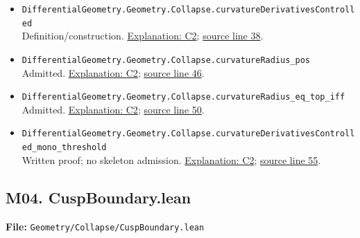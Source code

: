 \documentclass[
  letterpaper,
  11pt]{article}
\begin{document}
\begin{itemize}
\item
  {\small\texttt{Differential\allowbreak{}Geometry.\allowbreak{}Geometry.\allowbreak{}Collapse.\allowbreak{}curvature\allowbreak{}Derivatives\allowbreak{}Controlled}}\\
  Definition/construction. \hyperref[collapse-radius]{Explanation: C2};
  \href{https://github.com/qinz1yang/differential-geometry-dev/blob/ea0fae60ee01ef8c8d9b57a51794c6538f679c5d/DifferentialGeometry/Geometry/Collapse/CurvatureScale.lean\#L38}{source
  line 38}.
\item
  {\small\texttt{Differential\allowbreak{}Geometry.\allowbreak{}Geometry.\allowbreak{}Collapse.\allowbreak{}curvature\allowbreak{}Radius\_\allowbreak{}pos}}\\
  Admitted. \hyperref[collapse-radius]{Explanation: C2};
  \href{https://github.com/qinz1yang/differential-geometry-dev/blob/ea0fae60ee01ef8c8d9b57a51794c6538f679c5d/DifferentialGeometry/Geometry/Collapse/CurvatureScale.lean\#L46}{source
  line 46}.
\item
  {\small\texttt{Differential\allowbreak{}Geometry.\allowbreak{}Geometry.\allowbreak{}Collapse.\allowbreak{}curvature\allowbreak{}Radius\_\allowbreak{}eq\_\allowbreak{}top\_\allowbreak{}iff}}\\
  Admitted. \hyperref[collapse-radius]{Explanation: C2};
  \href{https://github.com/qinz1yang/differential-geometry-dev/blob/ea0fae60ee01ef8c8d9b57a51794c6538f679c5d/DifferentialGeometry/Geometry/Collapse/CurvatureScale.lean\#L50}{source
  line 50}.
\item
  {\small\texttt{Differential\allowbreak{}Geometry.\allowbreak{}Geometry.\allowbreak{}Collapse.\allowbreak{}curvature\allowbreak{}Derivatives\allowbreak{}Controlled\_\allowbreak{}mono\_\allowbreak{}threshold}}\\
  Written proof; no skeleton admission.
  \hyperref[collapse-radius]{Explanation: C2};
  \href{https://github.com/qinz1yang/differential-geometry-dev/blob/ea0fae60ee01ef8c8d9b57a51794c6538f679c5d/DifferentialGeometry/Geometry/Collapse/CurvatureScale.lean\#L55}{source
  line 55}.
\end{itemize}


\subsection{M04. CuspBoundary.lean}\label{m04.-cuspboundary.lean}

\textbf{File:}
{\small\texttt{Geometry/\allowbreak{}Collapse/\allowbreak{}Cusp\allowbreak{}Boundary.\allowbreak{}lean}}
\end{document}
